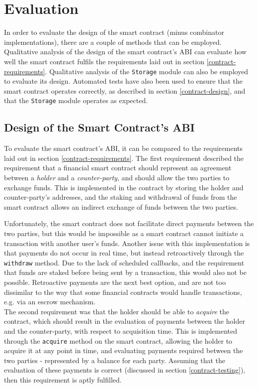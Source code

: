 \section{Evaluation} \label{DSL-impl-evaluation}

In order to evaluate the design of the smart contract (minus combinator implementations), there are a couple of methods that can be employed. Qualitative analysis of the design of the smart contract's ABI can evaluate how well the smart contract fulfils the requirements laid out in section \ref{contract-requirements}. Qualitative analysis of the \texttt{Storage} module can also be employed to evaluate its design. Automated tests have also been used to ensure that the smart contract operates correctly, as described in section \ref{contract-design}, and that the \texttt{Storage} module operates as expected.

\subsection{Design of the Smart Contract's ABI}

To evaluate the smart contract's ABI, it can be compared to the requirements laid out in section \ref{contract-requirements}. The first requirement described the requirement that a financial smart contract should represent an agreement between a \textit{holder} and a \textit{counter-party}, and should allow the two parties to exchange funds. This is implemented in the contract by storing the holder and counter-party's addresses, and the staking and withdrawal of funds from the smart contract allows an indirect exchange of funds between the two parties.

Unfortunately, the smart contract does not facilitate direct payments between the two parties, but this would be impossible as a smart contract cannot initiate a transaction with another user's funds. Another issue with this implementation is that payments do not occur in real time, but instead retroactively through the \texttt{withdraw} method. Due to the lack of scheduled callbacks, and the requirement that funds are staked before being sent by a transaction, this would also not be possible. Retroactive payments are the next best option, and are not too dissimilar to the way that some financial contracts would handle transactions, e.g. via an escrow mechanism. \\

The second requirement was that the holder should be able to \textit{acquire} the contract, which should result in the evaluation of payments between the holder and the counter-party, with respect to acquisition time. This is implemented through the \texttt{acquire} method on the smart contract, allowing the holder to acquire it at any point in time, and evaluating payments required between the two parties - represented by a balance for each party. Assuming that the evaluation of these payments is correct (discussed in section \ref{contract-testing}), then this requirement is aptly fulfilled. \\

